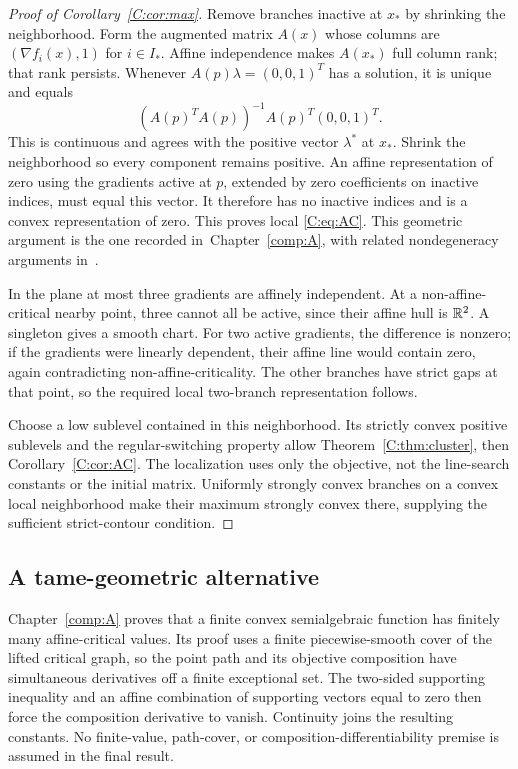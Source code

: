 \begin{proof}[Proof of Corollary~\ref{C:cor:max}]
Remove branches inactive at $x_*$ by shrinking the neighborhood. Form the augmented matrix $A(x)$ whose columns are $(\nabla f_i(x),1)$ for $i\in I_*$. Affine independence makes $A(x_*)$ full column rank; that rank persists. Whenever $A(p)\lambda=(0,0,1)^T$ has a solution, it is unique and equals
\[
 (A(p)^TA(p))^{-1}A(p)^T(0,0,1)^T.
\]
This is continuous and agrees with the positive vector $\lambda^*$ at $x_*$. Shrink the neighborhood so every component remains positive. An affine representation of zero using the gradients active at $p$, extended by zero coefficients on inactive indices, must equal this vector. It therefore has no inactive indices and is a convex representation of zero. This proves local \eqref{C:eq:AC}. This geometric argument is the one recorded in~Chapter~\ref{comp:A}, with related nondegeneracy arguments in~\cite{BG}.

In the plane at most three gradients are affinely independent. At a non-affine-critical nearby point, three cannot all be active, since their affine hull is $\mathbb R^2$. A singleton gives a smooth chart. For two active gradients, the difference is nonzero; if the gradients were linearly dependent, their affine line would contain zero, again contradicting non-affine-criticality. The other branches have strict gaps at that point, so the required local two-branch representation follows.

Choose a low sublevel contained in this neighborhood. Its strictly convex positive sublevels and the regular-switching property allow Theorem~\ref{C:thm:cluster}, then Corollary~\ref{C:cor:AC}. The localization uses only the objective, not the line-search constants or the initial matrix. Uniformly strongly convex branches on a convex local neighborhood make their maximum strongly convex there, supplying the sufficient strict-contour condition.
\end{proof}



\subsection{A tame-geometric alternative}

Chapter~\ref{comp:A} proves that a finite convex semialgebraic function has finitely many affine-critical values. Its proof uses a finite piecewise-smooth cover of the lifted critical graph, so the point path and its objective composition have simultaneous derivatives off a finite exceptional set. The two-sided supporting inequality and an affine combination of supporting vectors equal to zero then force the composition derivative to vanish. Continuity joins the resulting constants. No finite-value, path-cover, or composition-differentiability premise is assumed in the final result.

